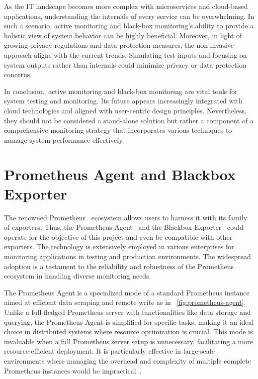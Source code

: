 As the IT landscape becomes more complex with microservices and cloud-based applications, understanding the internals of every service can be overwhelming. In such a scenario, active monitoring and black-box monitoring's ability to provide a holistic view of system behavior can be highly beneficial. Moreover, in light of growing privacy regulations and data protection measures, the non-invasive approach aligns with the current trends. Simulating test inputs and focusing on system outputs rather than internals could minimize privacy or data protection concerns. 

In conclusion, active monitoring and black-box monitoring are vital tools for system testing and monitoring. Its future appears increasingly integrated with cloud technologies and aligned with user-centric design principles. Nevertheless, they should not be considered a stand-alone solution but rather a component of a comprehensive monitoring strategy that incorporates various techniques to manage system performance effectively. 

\section{Prometheus Agent and Blackbox Exporter}

The renowned Prometheus~\parencite{PrometheusMonitoringSystem} ecosystem allows users to harness it with its family of exporters. Thus, the Prometheus Agent~\parencite{PrometheusAgentSupport} and the Blackbox Exporter~\parencite{BlackboxExporter} could operate for the objective of this project and even be compatible with other exporters. The technology is extensively employed in various enterprises for monitoring applications in testing and production environments. The widespread adoption is a testament to the reliability and robustness of the Prometheus ecosystem in handling diverse monitoring needs. 

The Prometheus Agent is a specialized mode of a standard Prometheus instance aimed at efficient data scraping and remote write as in ~\autoref{fig:prometheus-agent}. Unlike a full-fledged Prometheus server with functionalities like data storage and querying, the Prometheus Agent is simplified for specific tasks, making it an ideal choice in distributed systems where resource optimization is crucial. This mode is invaluable when a full Prometheus server setup is unnecessary, facilitating a more resource-efficient deployment. It is particularly effective in large-scale environments where managing the overhead and complexity of multiple complete Prometheus instances would be impractical~\parencite{plotkaIntroducingPrometheusAgent2021}.


